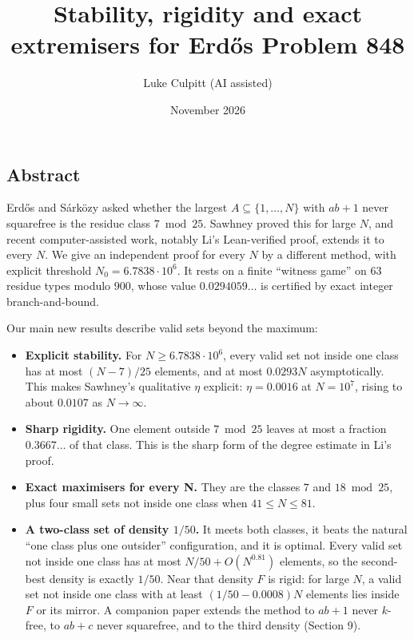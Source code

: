 \documentclass[
  11pt,
]{article}
\title{Stability, rigidity and exact extremisers for Erd\H{o}s Problem
848}
\author{Luke Culpitt (AI assisted)}
\date{November 2026}
\providecommand{\tightlist}{%
  \setlength{\itemsep}{0pt}\setlength{\parskip}{0pt}}
\begin{document}
\maketitle

\subsection{Abstract}

Erdős and Sárközy asked whether the largest
\(A \subseteq \{1, \dots, N\}\) with \(ab + 1\) never squarefree is the
residue class \(7 \bmod 25\). Sawhney proved this for large \(N\), and
recent computer-assisted work, notably Li's Lean-verified proof, extends
it to every \(N\). We give an independent proof for every \(N\) by a
different method, with explicit threshold \(N_0 = 6.7838\cdot 10^{6}\).
It rests on a finite ``witness game'' on 63 residue types modulo
\(900\), whose value \(0.0294059\dots\) is certified by exact integer
branch-and-bound.

Our main new results describe valid sets beyond the maximum:

\begin{itemize}
\tightlist
\item
  \textbf{Explicit stability.} For \(N \ge 6.7838\cdot 10^{6}\), every
  valid set not inside one class has at most \((N - 7)/25\) elements,
  and at most \(0.0293N\) asymptotically. This makes Sawhney's
  qualitative \(\eta\) explicit: \(\eta = 0.0016\) at \(N = 10^{7}\),
  rising to about \(0.0107\) as \(N \to \infty\).
\item
  \textbf{Sharp rigidity.} One element outside \(7 \bmod 25\) leaves at
  most a fraction \(0.3667\dots\) of that class. This is the sharp form
  of the degree estimate in Li's proof.
\item
  \textbf{Exact maximisers for every N.} They are the classes \(7\) and
  \(18 \bmod 25\), plus four small sets not inside one class when
  \(41 \le N \le 81\).
\item
  \textbf{A two-class set of density \(1/50\).} It meets both classes,
  it beats the natural ``one class plus one outsider'' configuration,
  and it is optimal. Every valid set not inside one class has at most
  \(N/50 + O(N^{0.81})\) elements, so the second-best density is exactly
  \(1/50\). Near that density \(F\) is rigid: for large \(N\), a valid
  set not inside one class with at least \((1/50 - 0.0008)N\) elements
  lies inside \(F\) or its mirror. A companion paper extends the method
  to \(ab + 1\) never \(k\)-free, to \(ab + c\) never squarefree, and to
  the third density (Section 9).
\end{itemize}
\end{document}
